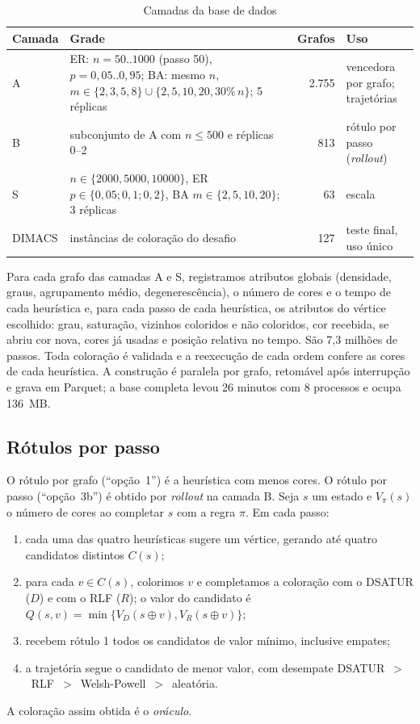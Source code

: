 \documentclass[conference,a4paper]{IEEEtran}
\begin{document}
\begin{table}[t]
\centering
\caption{Camadas da base de dados}\label{tab:camadas}
\footnotesize
\begin{tabular}{@{}l>{\raggedright\arraybackslash}p{2.6cm}r>{\raggedright\arraybackslash}p{2.4cm}@{}}
\toprule
Camada & Grade & Grafos & Uso \\
\midrule
A & ER: $n=50..1000$ (passo 50), $p=0{,}05..0{,}95$; BA: mesmo $n$, $m\in\{2, 3, 5, 8\}\cup\{2, 5, 10, 20, 30\%\,n\}$; 5 réplicas & 2.755 & vencedora por grafo; trajetórias \\
B & subconjunto de A com $n\le500$ e réplicas 0--2 & 813 & rótulo por passo (\emph{rollout}) \\
S & $n\in\{2000, 5000, 10000\}$, ER $p\in\{0{,}05;0{,}1;0{,}2\}$, BA $m\in\{2, 5, 10, 20\}$; 3 réplicas & 63 & escala \\
DIMACS & instâncias de coloração do desafio & 127 & teste final, uso único \\
\bottomrule
\end{tabular}
\end{table}

Para cada grafo das camadas A e S, registramos atributos globais (densidade, graus,
agrupamento médio, degenerescência), o número de cores e o tempo de cada heurística e, para
cada passo de cada heurística, os atributos do vértice escolhido: grau, saturação, vizinhos
coloridos e não coloridos, cor recebida, se abriu cor nova, cores já usadas e posição
relativa no tempo. São 7,3 milhões de passos. Toda coloração é validada e a reexecução de cada
ordem confere as cores de cada heurística. A construção é paralela por grafo, retomável após
interrupção e grava em Parquet; a base completa levou 26 minutos com 8 processos e ocupa
136~MB.

\subsection{Rótulos por passo}\label{sec:rotulos}
O rótulo por grafo (``opção~1'') é a heurística com menos cores. O rótulo por passo
(``opção~3b'') é obtido por \emph{rollout} na camada B. Seja $s$ um estado e $V_\pi(s)$ o
número de cores ao completar $s$ com a regra $\pi$. Em cada passo:
\begin{enumerate}
\item cada uma das quatro heurísticas sugere um vértice, gerando até quatro candidatos
distintos $C(s)$;
\item para cada $v\in C(s)$, colorimos $v$ e completamos a coloração com o DSATUR ($D$) e com o
RLF ($R$); o valor do candidato é $Q(s,v)=\min\{V_D(s\oplus v),V_R(s\oplus v)\}$;
\item recebem rótulo 1 todos os candidatos de valor mínimo, inclusive empates;
\item a trajetória segue o candidato de menor valor, com desempate
DSATUR~$>$~RLF~$>$~Welsh-Powell~$>$~aleatória.
\end{enumerate}
A coloração assim obtida é o \emph{oráculo}.
\end{document}
